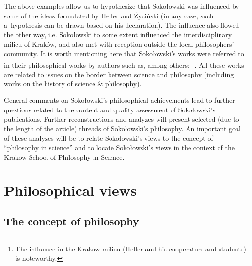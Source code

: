 The above examples allow us to hypothesize that Sokołowski was influenced by some of the ideas formulated by Heller and Życiński (in any case, such a~hypothesis can be drawn based on his declaration). The influence also flowed the other way, i.e. Sokołowski to some extent influenced the interdisciplinary milieu of Kraków, and also met with reception outside the local philosophers' community. It is worth mentioning here that Sokołowski's works were referred to in their philosophical works by authors such as, among others: 
\parencites[][]{Burtyn1997Idea}[][]{Turek2005Filozofia}[][]{Jodkowski2007Spor}[][]{Filipek2008Elementy}[][]{Czerniawski2009Ruch}[][]{Czerniawski2012Protofizyka}[][]{}[][]{Grygiel2010Teoria}[][]{}[][]{}[][]{}[][]{Heller2013Filozofia}[][]{Heller2014Granice}[][]{Pabjan2013Filozoficzne}[][]{}[][]{}[][]{Janowski2016Zagadnienie}[][]{Janusz2017Stulecie}[][]{Jacyna2018Kosmologia}[][]{Sobkowiak2019Relacje}[][]{}[][]{Trombik2021Koncepcje}%
\footnote{The influence in the Kraków milieu (Heller and his cooperators and students) is noteworthy.}. All these works are related to issues on the border between science and philosophy (including works on the history of science \& philosophy).



General comments on Sokołowski's philosophical achievements lead to further questions related to the content and quality assessment of Sokołowski's publications. Further reconstructions and analyzes will present selected (due to the length of the article) threads of Sokołowski's philosophy. An important goal of these analyzes will be to relate Sokołowski's views to the concept of ``philosophy in science'' and to locate Sokołowski's views in the context of the Krakow School of Philosophy in Science.



\section{Philosophical views}

\subsection{ The concept of philosophy}



